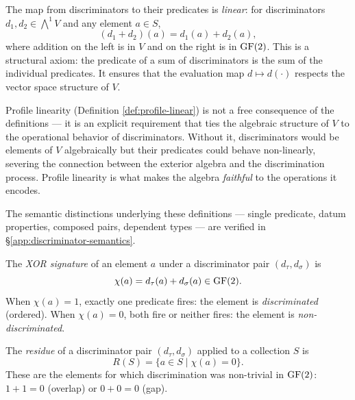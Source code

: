 \begin{definition}\label{def:profile-linear}
The map from discriminators to their predicates is
\emph{linear}: for discriminators $d_1, d_2 \in
\bigwedge^1 V$ and any element $a \in S$,
\begin{equation}
  (d_1 + d_2)(a) = d_1(a) + d_2(a),
\end{equation}
where addition on the left is in $V$ and on the right is
in $\operatorname{GF}(2)$. This is a structural axiom: the predicate of
a sum of discriminators is the sum of the individual
predicates. It ensures that the evaluation map
$d \mapsto d(\cdot)$ respects the vector space structure
of $V$.
\end{definition}

\begin{remark}
Profile linearity (Definition \ref{def:profile-linear}) is not a free consequence of the
definitions --- it is an explicit requirement that ties
the algebraic structure of $V$ to the operational behavior
of discriminators. Without it, discriminators would be
elements of $V$ algebraically but their predicates could
behave non-linearly, severing the connection between the
exterior algebra and the discrimination process. Profile
linearity is what makes the algebra \emph{faithful} to
the operations it encodes.
\end{remark}

The semantic distinctions underlying these definitions
--- single predicate, datum properties, composed pairs,
dependent types --- are verified in
\S\ref{app:discriminator-semantics}.

\begin{definition}
The \emph{XOR signature} of an element $a$ under a
discriminator pair $(d_\tau, d_\sigma)$ is
\begin{equation}
  \chi(a) = d_\tau(a) + d_\sigma(a) \in \operatorname{GF}(2).
\end{equation}
When $\chi(a) = 1$, exactly one predicate fires:
the element is \emph{discriminated} (ordered).
When $\chi(a) = 0$, both fire or neither fires:
the element is \emph{non-discriminated}.
\end{definition}

\begin{definition}[Residue]\label{def:residue}
The \emph{residue} of a discriminator pair
$(d_\tau, d_\sigma)$ applied to a collection $S$ is
\begin{equation}
  R(S) = \{ a \in S \mid \chi(a) = 0 \}.
\end{equation}
These are the elements for which discrimination was
non-trivial in $\operatorname{GF}(2)$: $1 + 1 = 0$ (overlap) or
$0 + 0 = 0$ (gap).
\end{definition}


